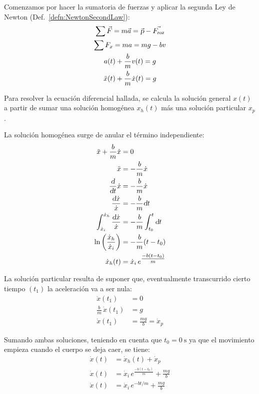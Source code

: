 \documentclass[a5paper,12pt,twoside]{book}
\begin{document}
Comenzamos por hacer la sumatoria de fuerzas y aplicar la segunda Ley de Newton (Def.\ \ref{defn:NewtonSecondLaw}):
\begin{gather*}
    \sum \Vec{F} = m\Vec{a} = \Vec{\textsl{p}} - \Vec{{{F}_\textsl{{roz}}}}
    \\
    \sum F_x = ma = mg - bv
    \\
    a(t) + \frac{b}{m} v(t) = g
    \\
    \ddot{x}(t) + \frac{b}{m} \dot{x}(t) = g
\end{gather*}

Para resolver la ecuación diferencial hallada, se calcula la solución general $x(t)$ a partir de sumar una solución homogénea $x_h(t)$ más una solución particular $x_p$.

La solución homogénea surge de anular el término independiente:
\begin{align*}
    \ddot{x} + \frac{b}{m} \dot{x} &= 0
    \\
    \ddot{x} &= - \frac{b}{m} \dot{x}
    \\
    \frac{\textsl{d}}{\textsl{d} t} \dot{x} &= - \frac{b}{m} \dot{x}
    \\
    \frac{\textsl{d} \dot{x}}{\dot{x}} &= - \frac{b}{m} \textsl{d} t
    \\
    \int_{\dot{x}_i}^{\dot{x}_h} \frac{\textsl{d} \dot{x}}{\dot{x}} &= - \frac{b}{m} \int_{t_0}^t \textsl{d} t
    \\
    \ln{ \left( \frac{\dot{x}_h}{\dot{x}_i} \right) } &= - \frac{b}{m} (t-t_0)
    \\
    \dot{x}_h(t) &= \dot{x}_i \, e^ {\tfrac{-b(t-t_0)}{m}}
\end{align*}

La solución particular resulta de suponer que, eventualmente transcurrido cierto tiempo $(t_1)$ la aceleración va a ser nula:
\begin{align*}
    \ddot{x}(t_1) &= 0
    \\
    \frac{b}{m} \, \dot{x}(t_1) &= g
    \\
    \dot{x}(t_1) &= \frac{mg}{b} = \dot{x}_p
\end{align*}

Sumando ambas soluciones, teniendo en cuenta que $t_0 = \SI{0}{\second}$ ya que el movimiento empieza cuando el cuerpo se deja caer, se tiene:
\begin{align*}
    \dot{x}(t) &= \dot{x}_h(t) + \dot{x}_p
    \\
    \dot{x}(t) &= \dot{x}_i \, e^ {\tfrac{-b(t-t_0)}{m}} + \frac{mg}{b}
    \\
    \dot{x}(t) &= \dot{x}_i \, e^ {-bt/m} + \frac{mg}{b}
\end{align*}
\end{document}
